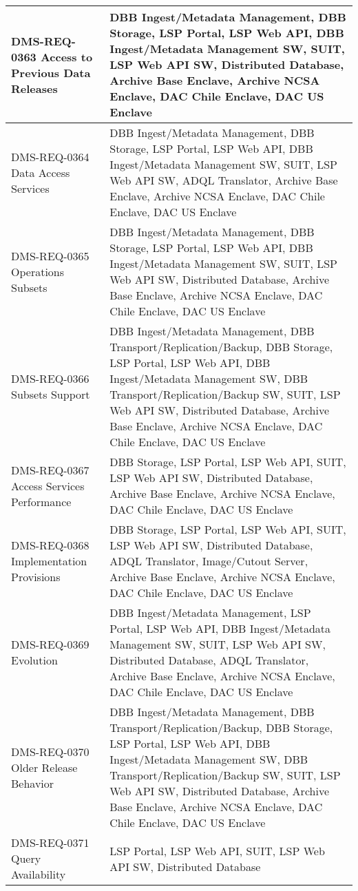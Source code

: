 \begin{longtable}{p{}p{}}
DMS-REQ-0363 Access to Previous Data Releases & DBB Ingest/Metadata Management, DBB Storage, LSP Portal, LSP Web API, DBB Ingest/Metadata Management SW, SUIT, LSP Web API SW, Distributed Database, Archive Base Enclave, Archive NCSA Enclave, DAC Chile Enclave, DAC US Enclave \\ \hline
DMS-REQ-0364 Data Access Services & DBB Ingest/Metadata Management, DBB Storage, LSP Portal, LSP Web API, DBB Ingest/Metadata Management SW, SUIT, LSP Web API SW, ADQL Translator, Archive Base Enclave, Archive NCSA Enclave, DAC Chile Enclave, DAC US Enclave \\ \hline
DMS-REQ-0365 Operations Subsets & DBB Ingest/Metadata Management, DBB Storage, LSP Portal, LSP Web API, DBB Ingest/Metadata Management SW, SUIT, LSP Web API SW, Distributed Database, Archive Base Enclave, Archive NCSA Enclave, DAC Chile Enclave, DAC US Enclave \\ \hline
DMS-REQ-0366 Subsets Support & DBB Ingest/Metadata Management, DBB Transport/Replication/Backup, DBB Storage, LSP Portal, LSP Web API, DBB Ingest/Metadata Management SW, DBB Transport/Replication/Backup SW, SUIT, LSP Web API SW, Distributed Database, Archive Base Enclave, Archive NCSA Enclave, DAC Chile Enclave, DAC US Enclave \\ \hline
DMS-REQ-0367 Access Services Performance & DBB Storage, LSP Portal, LSP Web API, SUIT, LSP Web API SW, Distributed Database, Archive Base Enclave, Archive NCSA Enclave, DAC Chile Enclave, DAC US Enclave \\ \hline
DMS-REQ-0368 Implementation Provisions & DBB Storage, LSP Portal, LSP Web API, SUIT, LSP Web API SW, Distributed Database, ADQL Translator, Image/Cutout Server, Archive Base Enclave, Archive NCSA Enclave, DAC Chile Enclave, DAC US Enclave \\ \hline
DMS-REQ-0369 Evolution & DBB Ingest/Metadata Management, LSP Portal, LSP Web API, DBB Ingest/Metadata Management SW, SUIT, LSP Web API SW, Distributed Database, ADQL Translator, Archive Base Enclave, Archive NCSA Enclave, DAC Chile Enclave, DAC US Enclave \\ \hline
DMS-REQ-0370 Older Release Behavior & DBB Ingest/Metadata Management, DBB Transport/Replication/Backup, DBB Storage, LSP Portal, LSP Web API, DBB Ingest/Metadata Management SW, DBB Transport/Replication/Backup SW, SUIT, LSP Web API SW, Distributed Database, Archive Base Enclave, Archive NCSA Enclave, DAC Chile Enclave, DAC US Enclave \\ \hline
DMS-REQ-0371 Query Availability & LSP Portal, LSP Web API, SUIT, LSP Web API SW, Distributed Database \\ \hline

\end{longtable}
